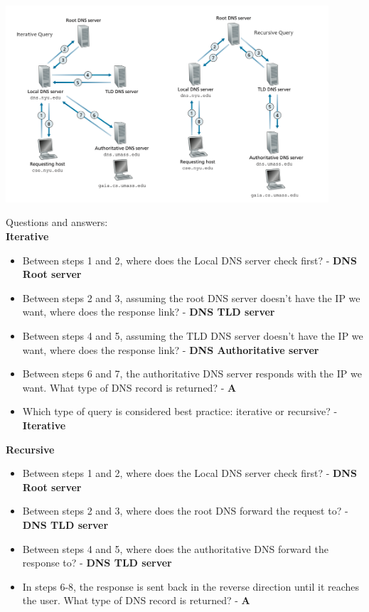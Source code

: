 \documentclass{article}
\begin{document}
\centerline{\includegraphics[width=12cm]{assets/ex7}}
\noindent Questions and answers: \\

\textbf{Iterative}
\begin{itemize}
	\item Between steps 1 and 2, where does the Local DNS server check first? - \textbf{DNS Root server}
	\item Between steps 2 and 3, assuming the root DNS server doesn't have the IP we want, where does the response link? - \textbf{DNS TLD server}
	\item Between steps 4 and 5, assuming the TLD DNS server doesn't have the IP we want, where does the response link? - \textbf{DNS Authoritative server}
	\item Between steps 6 and 7, the authoritative DNS server responds with the IP we want. What type of DNS record is returned? - \textbf{A}
	\item Which type of query is considered best practice: iterative or recursive? - \textbf{Iterative}
\end{itemize}

\textbf{Recursive}
\begin{itemize}
	\item Between steps 1 and 2, where does the Local DNS server check first? - \textbf{DNS Root server}
	\item Between steps 2 and 3, where does the root DNS forward the request to? - \textbf{DNS TLD server}
	\item Between steps 4 and 5, where does the authoritative DNS forward the response to? - \textbf{DNS TLD server}
	\item In steps 6-8, the response is sent back in the reverse direction until it reaches the user. What type of DNS record is returned? - \textbf{A}
\end{itemize}
\end{document}
